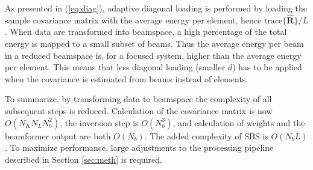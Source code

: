 \documentclass[journal]{IEEEtran}
\newcommand{\mat}[1]{\mathbf{#1}}
\renewcommand{\vec}[1]{\mathbf{#1}}
\begin{document}
As presented in (\ref{eq:diag}), adaptive diagonal loading is performed by loading the sample covariance matrix with the average energy per element, hence $\text{trace}\{\mat{\hat{R}}\}/L$. When data are transformed into beamspace, a high percentage of the total energy is mapped to a small subset of beams. Thus the average energy per beam in a reduced beamspace is, for a focused system, higher than the average energy per element. This means that less diagonal loading (smaller $d$) has to be applied when the covariance is estimated from beams instead of elements. 

To summarize, by transforming data to beamspace the complexity of all subsequent steps is reduced. Calculation of the covariance matrix is now $O(N_KN_LN_b^2)$, the inversion step is $O(N_b^3)$, and calculation of weights and the beamformer output are both $O(N_b)$. The added complexity of SBS is $O(N_bL)$. To maximize performance, large adjustments to the processing pipeline described in Section \ref{sec:meth} is required.





 
\end{document}
